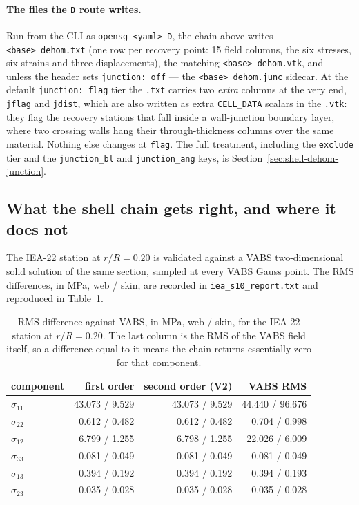 \paragraph{The files the \texttt{D} route writes.} Run from the CLI as
\texttt{opensg <yaml> D}, the chain above writes
\texttt{<base>\_dehom.txt} (one row per recovery point: 15 field columns, the
six stresses, six strains and three displacements), the matching
\texttt{<base>\_dehom.vtk}, and --- unless the header sets
\texttt{junction: off} --- the \texttt{<base>\_dehom.junc} sidecar. At the
default \texttt{junction: flag} tier the \texttt{.txt} carries two \emph{extra}
columns at the very end, \texttt{jflag} and \texttt{jdist}, which are also
written as extra \texttt{CELL\_DATA} scalars in the \texttt{.vtk}: they flag the
recovery stations that fall inside a wall-junction boundary layer, where two
crossing walls hang their through-thickness columns over the same material.
Nothing else changes at \texttt{flag}. The full treatment, including the
\texttt{exclude} tier and the \texttt{junction\_bl} and \texttt{junction\_ang}
keys, is Section~\ref{sec:shell-dehom-junction}.

\subsection{What the shell chain gets right, and where it does not}

The IEA-22 station at $r/R = 0.20$ is validated against a VABS two-dimensional
solid solution of the same section, sampled at every VABS Gauss point. The RMS
differences, in MPa, web / skin, are recorded in \texttt{iea\_s10\_report.txt}
and reproduced in Table~\ref{tab:dehomrms}.

\begin{table}[htbp]
\centering
\caption{RMS difference against VABS, in MPa, web / skin, for the IEA-22
station at $r/R = 0.20$. The last column is the RMS of the VABS field itself,
so a difference equal to it means the chain returns essentially zero for that
component.}
\label{tab:dehomrms}
\small
\begin{tabular}{lrrr}
\toprule
component & first order & second order (V2) & VABS RMS \\
\midrule
$\sigma_{11}$ & 43.073 / 9.529 & 43.073 / 9.529 & 44.440 / 96.676 \\
$\sigma_{22}$ & 0.612 / 0.482 & 0.612 / 0.482 & 0.704 / 0.998 \\
$\sigma_{12}$ & 6.799 / 1.255 & 6.798 / 1.255 & 22.026 / 6.009 \\
$\sigma_{33}$ & 0.081 / 0.049 & 0.081 / 0.049 & 0.081 / 0.049 \\
$\sigma_{13}$ & 0.394 / 0.192 & 0.394 / 0.192 & 0.394 / 0.193 \\
$\sigma_{23}$ & 0.035 / 0.028 & 0.035 / 0.028 & 0.035 / 0.028 \\
\bottomrule
\end{tabular}
\end{table}

